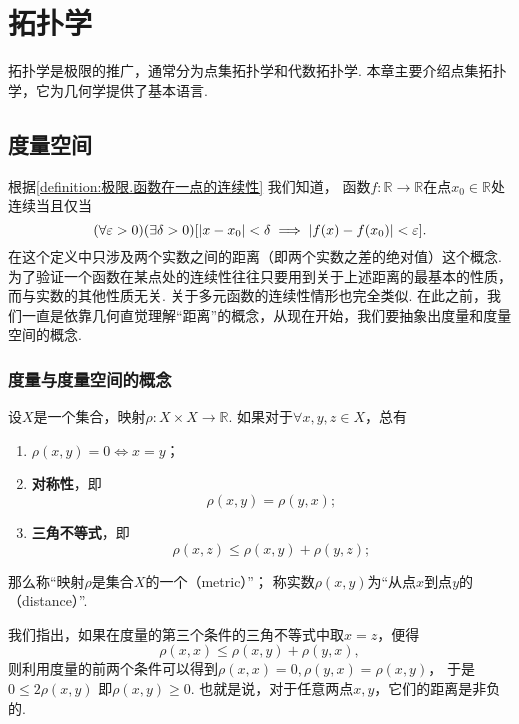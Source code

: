 \chapter{拓扑学}
拓扑学是极限的推广，通常分为点集拓扑学和代数拓扑学.
本章主要介绍点集拓扑学，它为几何学提供了基本语言.

\section{度量空间}
根据\cref{definition:极限.函数在一点的连续性} 我们知道，
函数\(f\colon\mathbb{R}\to\mathbb{R}\)在点\(x_0\in\mathbb{R}\)处连续当且仅当\[
	(\forall\varepsilon>0)
	(\exists\delta>0)
	[
		\abs{x - x_0}<\delta
		\implies
		\abs{f(x) - f(x_0)} < \varepsilon
	].
\]
在这个定义中只涉及两个实数之间的距离（即两个实数之差的绝对值）这个概念.
为了验证一个函数在某点处的连续性往往只要用到关于上述距离的最基本的性质，而与实数的其他性质无关.
关于多元函数的连续性情形也完全类似.
在此之前，我们一直是依靠几何直觉理解“距离”的概念，从现在开始，我们要抽象出度量和度量空间的概念.

\subsection{度量与度量空间的概念}
\begin{definition}
设\(X\)是一个集合，映射\(\rho\colon X \times X\to\mathbb{R}\).
如果对于\(\forall x,y,z \in X\)，总有\begin{enumerate}
	\item \(\rho(x,y)=0 \iff x=y\)；

	\item {\bf 对称性}，即\[
		\rho(x,y) = \rho(y,x);
	\]

	\item {\bf 三角不等式}，即\[
		\rho(x,z) \leq \rho(x,y) + \rho(y,z);
	\]
\end{enumerate}
那么称“映射\(\rho\)是集合\(X\)的一个（metric）”；
称实数\(\rho(x,y)\)为“从点\(x\)到点\(y\)的（distance）”.
\end{definition}

我们指出，如果在度量的第三个条件的三角不等式中取\(x=z\)，便得\[
	\rho(x,x)\leq\rho(x,y)+\rho(y,x),
\]
则利用度量的前两个条件可以得到\(\rho(x,x)=0,\rho(y,x)=\rho(x,y)\)，
于是\(0\leq2\rho(x,y)\)
即\(\rho(x,y)\geq0\).
也就是说，对于任意两点\(x,y\)，它们的距离是非负的.

